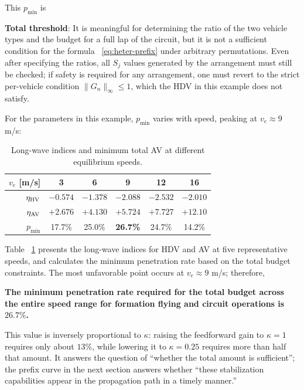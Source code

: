 \documentclass[11pt,a4paper,openany]{book}
\numberwithin{equation}{chapter}
\numberwithin{figure}{chapter}
\numberwithin{table}{chapter}
\begin{document}
This $p_{\min}$ is




\textbf{Total threshold}: It is meaningful for determining the ratio of the two vehicle types and the budget for a full lap of the circuit, but it is not a sufficient condition for the formula ~\eqref{eq:heter-prefix} under arbitrary permutations. Even after specifying the ratios, all $S_j$ values generated by the arrangement must still be checked; if safety is required for any arrangement, one must revert to the strict per-vehicle condition $\|G_n\|_\infty\le1$, which the HDV in this example does not satisfy.




For the parameters in this example, $p_{\min}$ varies with speed, peaking at $v_e\approx9$ m/s:










\begin{table}[htbp]
\centering
\caption{Long-wave indices and minimum total AV at different equilibrium speeds.}
\label{tab:heter-pmin-speed}
\begin{tabular}{rccccc}
\toprule
$v_e$ [m/s] & 3 & 6 & 9 & 12 & 16 \\
\midrule
$\eta_{\rm HV}$ & $-0.574$ & $-1.378$ & $-2.088$ & $-2.532$ & $-2.010$ \\
$\eta_{\rm AV}$ & $+2.676$ & $+4.130$ & $+5.724$ & $+7.727$ & $+12.10$ \\
$p_{\min}$ & 17.7\% & 25.0\% & \textbf{26.7\%} & 24.7\% & 14.2\% \\
\bottomrule
\end{tabular}
\end{table}










Table ~\ref{tab:heter-pmin-speed} presents the long-wave indices for HDV and AV at five representative speeds, and calculates the minimum penetration rate based on the total budget constraints. The most unfavorable point occurs at $v_e\approx9$ m/s; therefore,




\textbf{The minimum penetration rate required for the total budget across the entire speed range for formation flying and circuit operations is $26.7\%$.}




 This value is inversely proportional to $\kappa$: raising the feedforward gain to $\kappa=1$ requires only about $13\%$, while lowering it to $\kappa=0.25$ requires more than half that amount. It answers the question of “whether the total amount is sufficient”; the prefix curve in the next section answers whether “these stabilization capabilities appear in the propagation path in a timely manner.”
\end{document}
